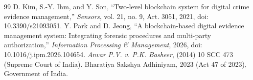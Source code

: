 \documentclass[conference,a4paper,10pt]{IEEEtran}
\begin{document}
\begin{thebibliography}{99}
 D. Kim, S.-Y. Ihm, and Y. Son, ``Two-level blockchain system for digital crime evidence management,'' \emph{Sensors}, vol. 21, no. 9, Art. 3051, 2021, doi: 10.3390/s21093051.
 Y. Park and D. Jeong, ``A blockchain-based digital evidence management system: Integrating forensic procedures and multi-party authorization,'' \emph{Information Processing \& Management}, 2026, doi: 10.1016/j.ipm.2026.104654.
 \emph{Anvar P.V. v. P.K. Basheer}, (2014) 10 SCC 473 (Supreme Court of India).
 Bharatiya Sakshya Adhiniyam, 2023 (Act 47 of 2023), Government of India.
\end{thebibliography}
\end{document}
